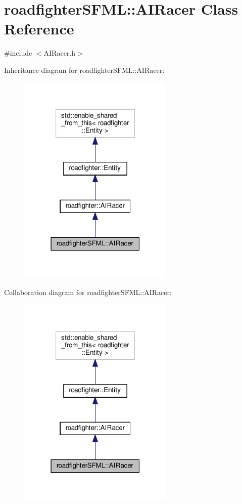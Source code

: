 \hypertarget{classroadfighterSFML_1_1AIRacer}{}\section{roadfighter\+S\+F\+ML\+:\+:A\+I\+Racer Class Reference}
\label{classroadfighterSFML_1_1AIRacer}


{\ttfamily \#include $<$A\+I\+Racer.\+h$>$}



Inheritance diagram for roadfighter\+S\+F\+ML\+:\+:A\+I\+Racer\+:\nopagebreak
\begin{figure}[H]
\begin{center}
\leavevmode
\includegraphics[width=211pt]{classroadfighterSFML_1_1AIRacer__inherit__graph}
\end{center}
\end{figure}


Collaboration diagram for roadfighter\+S\+F\+ML\+:\+:A\+I\+Racer\+:\nopagebreak
\begin{figure}[H]
\begin{center}
\leavevmode
\includegraphics[width=211pt]{classroadfighterSFML_1_1AIRacer__coll__graph}
\end{center}
\end{figure}
